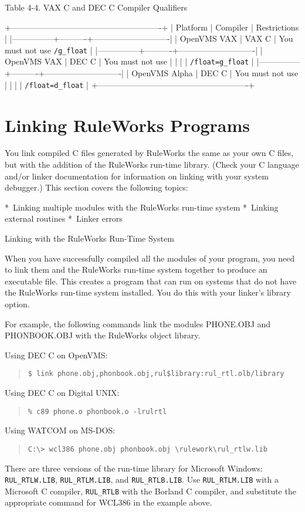 Table 4-4. VAX C and DEC C Compiler Qualifiers

+-------------------------------------------------------+
| Platform      | Compiler | Restrictions               |
|---------------+----------+----------------------------|
| OpenVMS VAX   | VAX C    | You must not use \verb|/g_float|  |
|---------------+----------+----------------------------|
| OpenVMS VAX   | DEC C    | You must not use           |
|               |          | \verb|/float=g_float|             |
|---------------+----------+----------------------------|
| OpenVMS Alpha | DEC C    | You must not use           |
|               |          | \verb|/float=d_float|             |
+-------------------------------------------------------+


\section{Linking RuleWorks Programs}

You link compiled C files generated by RuleWorks the same
as your own C files, but with the addition of the
RuleWorks run-time library. (Check your C language and/or
linker documentation for information on linking with your
system debugger.) This section covers the following
topics:

  * Linking multiple modules with the RuleWorks run-time
    system
  * Linking external routines
  * Linker errors

Linking with the RuleWorks Run-Time System

When you have successfully compiled all the modules of
your program, you need to link them and the RuleWorks
run-time system together to produce an executable file.
This creates a program that can run on systems that do
not have the RuleWorks run-time system installed. You do
this with your linker's library option.

For example, the following commands link the modules
PHONE.OBJ and PHONBOOK.OBJ with the RuleWorks object
library.

Using DEC C on OpenVMS:
\begin{quote}
\begin{verbatim}
$ link phone.obj,phonbook.obj,rul$library:rul_rtl.olb/library
\end{verbatim}
\end{quote}  
Using DEC C on Digital UNIX:
\begin{quote}
\begin{verbatim}
% c89 phone.o phonbook.o -lrulrtl
\end{verbatim}
\end{quote}
Using WATCOM on MS-DOS:
\begin{quote}
\begin{verbatim}
C:\> wcl386 phone.obj phonbook.obj \rulework\rul_rtlw.lib
\end{verbatim}
\end{quote}  
There are three versions of the run-time library for
Microsoft Windows: \verb|RUL_RTLW.LIB|, \verb|RUL_RTLM.LIB|, and
\verb|RUL_RTLB.LIB|. Use \verb|RUL_RTLM.LIB| with a Microsoft C
compiler, \verb|RUL_RTLB| with the Borland C compiler, and
substitute the appropriate command for WCL386 in the
example above.


